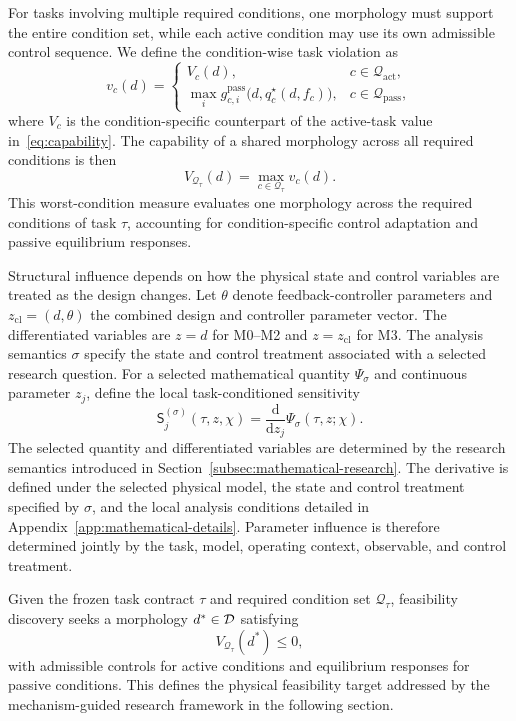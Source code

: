 For tasks involving multiple required conditions, one morphology must support the entire condition set, while each active condition may use its own admissible control sequence. We define the condition-wise task violation as
\begin{equation}
v_c(d)=
\begin{cases}
V_c(d), & c\in\mathcal Q_{\mathrm{act}},\\[0.6em]
\displaystyle\max_i g^{\mathrm{pass}}_{c,i}\bigl(d,q_c^\star(d,f_c)\bigr),
& c\in\mathcal Q_{\mathrm{pass}},
\end{cases}
\label{eq:condition-violation}
\end{equation}
where $V_c$ is the condition-specific counterpart of the active-task value in~\eqref{eq:capability}. The capability of a shared morphology across all required conditions is then
\begin{equation}
V_{\mathcal Q_\tau}(d)=\max_{c\in\mathcal Q_\tau}v_c(d).
\label{eq:multi-capability}
\end{equation}
This worst-condition measure evaluates one morphology across the required conditions of task $\tau$, accounting for condition-specific control adaptation and passive equilibrium responses.

Structural influence depends on how the physical state and control variables are treated as the design changes. Let $\theta$ denote feedback-controller parameters and $z_{\mathrm{cl}}=(d,\theta)$ the combined design and controller parameter vector. The differentiated variables are $z=d$ for M0--M2 and $z=z_{\mathrm{cl}}$ for M3. The analysis semantics $\sigma$ specify the state and control treatment associated with a selected research question. For a selected mathematical quantity $\Psi_\sigma$ and continuous parameter $z_j$, define the local task-conditioned sensitivity
\begin{equation}
\mathsf S_j^{(\sigma)}(\tau,z,\chi)
=\frac{\mathrm d}{\mathrm d z_j}\Psi_\sigma(\tau,z;\chi).
\label{eq:conditioned-sensitivity}
\end{equation}
The selected quantity and differentiated variables are determined by the research semantics introduced in Section~\ref{subsec:mathematical-research}. The derivative is defined under the selected physical model, the state and control treatment specified by $\sigma$, and the local analysis conditions detailed in Appendix~\ref{app:mathematical-details}. Parameter influence is therefore determined jointly by the task, model, operating context, observable, and control treatment.

Given the frozen task contract $\tau$ and required condition set $\mathcal Q_\tau$, feasibility discovery seeks a morphology $d^*\in\mathcal{D}$ satisfying
\begin{equation}
V_{\mathcal Q_\tau}(d^*)\leq0,
\label{eq:feasibility-target}
\end{equation}
with admissible controls for active conditions and equilibrium responses for passive conditions. This defines the physical feasibility target addressed by the mechanism-guided research framework in the following section.
